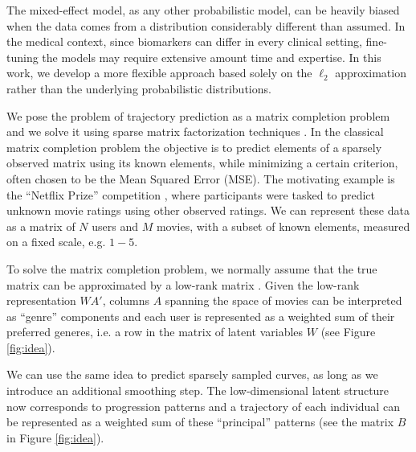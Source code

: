 \documentclass[preprint]{imsart}
\numberwithin{equation}{section}
\theoremstyle{plain}
\begin{document}

The mixed-effect model, as any other probabilistic model, can be heavily biased when the data comes from a distribution considerably different than assumed. In the medical context, since biomarkers can differ in every clinical setting, fine-tuning the models may require extensive amount time and expertise. In this work, we develop a more flexible approach based solely on the $\ell_2$ approximation rather than the underlying probabilistic distributions.

We pose the problem of trajectory prediction as a matrix completion problem and we solve it using sparse matrix factorization techniques \citep{rennie2005fast, candes2009exact}. In the classical matrix completion problem the objective is to predict elements of a sparsely observed matrix using its known elements, while minimizing a certain criterion, often chosen to be the Mean Squared Error (MSE). The motivating example is the ``Netflix Prize'' competition \citep{bennett2007netflix}, where participants were tasked to predict unknown movie ratings using other observed ratings. We can represent these data as a matrix of $N$ users and $M$ movies, with a subset of known elements, measured on a fixed scale, e.g. $1-5$.

To solve the matrix completion problem, we normally assume that the true matrix can be approximated by a low-rank matrix \citep{srebro2005generalization}. Given the low-rank representation $WA'$, columns $A$ spanning the space of movies can be interpreted as ``genre'' components and each user is represented as a weighted sum of their preferred generes, i.e. a row in the matrix of latent variables $W$ (see Figure \ref{fig:idea}).

We can use the same idea to predict sparsely sampled curves, as long as we introduce an additional smoothing step. The low-dimensional latent structure now corresponds to progression patterns and a trajectory of each individual can be represented as a weighted sum of these ``principal'' patterns (see the matrix $B$ in Figure \ref{fig:idea}).

\end{document}
